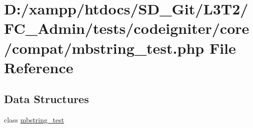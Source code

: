 \hypertarget{mbstring__test_8php}{}\section{D\+:/xampp/htdocs/\+S\+D\+\_\+\+Git/\+L3\+T2/\+F\+C\+\_\+\+Admin/tests/codeigniter/core/compat/mbstring\+\_\+test.php File Reference}
\label{mbstring__test_8php}
\subsection*{Data Structures}
\begin{DoxyCompactItemize}
\item 
class \hyperlink{classmbstring__test}{mbstring\+\_\+test}
\end{DoxyCompactItemize}
